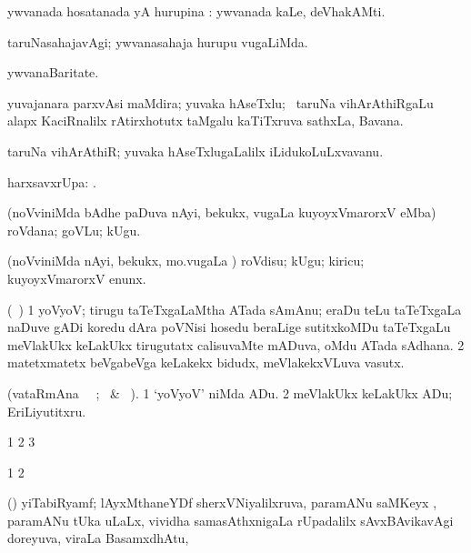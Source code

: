  ywvanada hosatanada yA hurupina :  ywvanada kaLe, deVhakAMti.
\eanum
\emng 
\eentry

\bentry
{} 
\gl{\kirxvi} 
\bmng
taruNasahajavAgi; ywvanasahaja hurupu \mo vugaLiMda.
\emng
\eentry

\bentry
{}  
\gl{\nA} 
\bmng
ywvanaBaritate.
\emng
\eentry

\bentry
{}  
\gl{\nA} 
\bmng
yuvajanara parxvAsi maMdira; yuvaka hAseTxlu; \kanmu\ taruNa vihArAthiRgaLu alapx KaciRnalilx rAtirxhotutx taMgalu kaTiTxruva sathxLa, Bavana.
\emng
\eentry

\bentry
{}
\gl{\nA} 
\bmng
taruNa vihArAthiR; yuvaka hAseTxlugaLalilx iLidukoLuLxvavanu.
\emng
\eentry

\bentry
{} 
\gl{}
\bmng
harxsavxrUpa: .
\emng
\eentry

\bentry
{} 
\gl{\nA} 
\bmng
(noVviniMda bAdhe paDuva nAyi, bekukx, \mo vugaLa kuyoyxVmarorxV eMba)  roVdana; goVLu; kUgu.
\emng
\eentry

\bentry
{} 
\gl{\akirx} 
\bmng
(noVviniMda nAyi, bekukx, mo.vugaLa \vi) roVdisu; kUgu; kiricu; kuyoyxVmarorxV enunx.
\emng
\eentry

\bentry
{} 
\gl{\nA} 
\bmng
(\bava\ )
\bnum
\num{1} yoVyoV; tirugu taTeTxgaLaMtha ATada sAmAnu; eraDu teLu taTeTxgaLa naDuve gADi koredu dAra poVNisi hosedu beraLige sutitxkoMDu taTeTxgaLu meVlakUkx keLakUkx tirugutatx calisuvaMte mADuva, oMdu ATada sAdhana. 
\num{2} matetxmatetx beVgabeVga keLakekx bidudx, meVlakekxVLuva vasutx.
\enum
\emng
\eentry

\bentry
{} 
\gl{\akirx} 
\bmng
(vataRmAna \parxpu\ \Eva\ ; \BU\ \& \BUkaq\ ). 
\bnum
\num{1} `yoVyoV' niMda ADu. 
\num{2} meVlakUkx keLakUkx ADu; EriLiyutitxru.
\enum
\emng
\eentry

\bentry
{}
\gl{\saMkiSx} 
\bmng
\bnum
\num{1} 
\num{2}  
\num{3} 
\enum
\emng
\eentry

\bentry
{}
\gl{\saMkiSx} 
\bmng
\bnum
\num{1}  
\num{2} 
\enum
\emng
\eentry

\bentry
{} 
\gl{\nA} 
\bmng
(\ravi) yiTabiRyamf;  lAyxMthaneYDf sherxVNiyalilxruva, paramANu saMKeyx , paramANu tUka  uLaLx, vividha samasAthxnigaLa rUpadalilx sAvxBAvikavAgi doreyuva, viraLa BasamxdhAtu, \saMkeV\ 
\emng
\eentry


